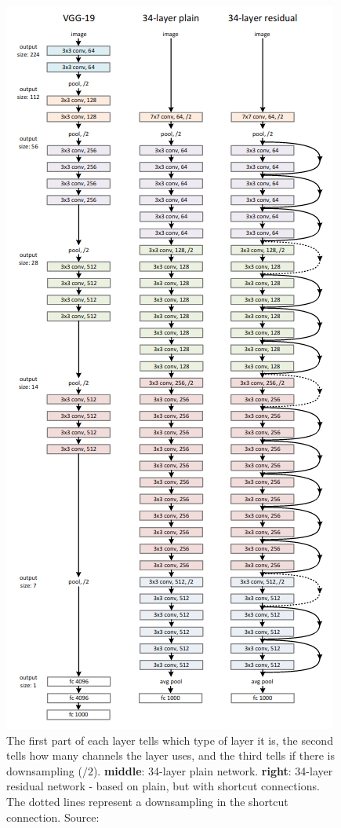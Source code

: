 \begin{figure}
    \centering
    \includegraphics[scale=0.69]{assets/residual-net.png}
    \caption{The first part of each layer tells which type of layer it is, the second tells how many channels the layer uses, and the third tells if there is downsampling ($/2$). \textbf{middle}: 34-layer plain network. \textbf{right}: 34-layer residual network - based on plain, but with shortcut connections. The dotted lines represent a downsampling in the shortcut connection. Source: \cite{resnet}}
    \label{fig:resnet}
\end{figure}


